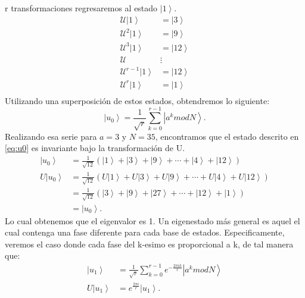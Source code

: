 r transformaciones regresaremos al estado $\left|1\right\rangle$.
\begin{align*}
    \mathcal{U}\left| 1 \right\rangle &= \left|3\right\rangle \\
    \mathcal{U}^2\left| 1 \right\rangle &= \left|9\right\rangle \\
    \mathcal{U}^3\left| 1 \right\rangle &= \left|12\right\rangle \\ 
    \mathcal{U}               & \vdots  \\ 
    \mathcal{U}^{r-1}\left| 1 \right\rangle &= \left|12\right\rangle \\
    \mathcal{U}^r\left| 1 \right\rangle &= \left|1\right\rangle \\
\end{align*}
Utilizando una superposición de estos estados, obtendremos lo siguiente:
\begin{equation}
    \left| u_0 \right\rangle = \frac{1}{\sqrt{r}} \sum\limits_{k=0}^{r-1} \left|a^k mod N \right\rangle.
    \label{eq:u0}
\end{equation}
Realizando esa serie para $a=3$ y $N=35$, encontramos que el estado descrito en \ref{eq:u0} es invariante bajo la transformación de U.
\begin{align*}
    \left| u_0 \right\rangle &= \frac{1}{\sqrt{12}} \left(\left|1\right\rangle + \left|3\right\rangle+ \left|9\right\rangle 
    +\cdots +\left|4\right\rangle + \left|12\right\rangle \right)\\
    U\left| u_0 \right\rangle &= \frac{1}{\sqrt{12}} \left(U\left|1\right\rangle + U\left|3\right\rangle+ U\left|9\right\rangle 
    +\cdots +U\left|4\right\rangle + U\left|12\right\rangle \right)\\
    &= \frac{1}{\sqrt{12}} \left(\left|3\right\rangle + \left|9\right\rangle+ \left|27\right\rangle 
    +\cdots +\left|12\right\rangle + \left|1\right\rangle \right)\\
    &= \left| u_0 \right\rangle .
\end{align*}
Lo cual obtenemos que el eigenvalor es 1. Un eigenestado más general es aquel el cual contenga una fase diferente para cada base de estados. Especificamente, veremos el caso
donde cada fase del k-esimo es proporcional a k, de tal manera que:
\begin{align}
    \label{eq:u1}
    \left| u_1 \right\rangle &= \frac{1}{\sqrt{r}} \sum\limits_{k=0}^{r-1} e^{-\frac{2\pi i k}{r}} \left| a^k mod N \right\rangle \\
    \label{eq:ua1}
    U\left| u_1 \right\rangle &= e^{\frac{2\pi i}{r}} \left| u_1 \right\rangle.
\end{align}
